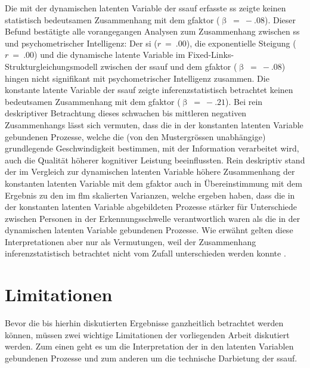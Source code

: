 \documentclass[11pt, twoside, a4paper]{book}		%
\begin{document}
Die mit der dynamischen latenten Variable der \gls{ssauf} erfasste \gls{ss} zeigte keinen statistisch bedeutsamen Zusammenhang mit dem \gls{gfaktor} ($\upbeta~=~-.08$). Dieser Befund bestätigte alle vorangegangen Analysen zum Zusammenhang zwischen \gls{ss} und psychometrischer Intelligenz: Der \gls{si} ($r~=~.00$), die exponentielle Steigung ($r~=~.00$) und die dynamische latente Variable im Fixed-Links-Struk\-tur\-glei\-chungs\-mo\-dell zwischen der \gls{ssauf} und dem \gls{gfaktor} ($\upbeta~=~-.08$) hingen nicht signifikant mit psychometrischer Intelligenz zusammen.
Die konstante latente Variable der \gls{ssauf} zeigte inferenzstatistisch betrachtet keinen bedeutsamen Zusammenhang mit dem \gls{gfaktor} ($\upbeta~=~-.21$). Bei rein deskriptiver Betrachtung dieses schwachen bis mittleren negativen Zusammenhangs lässt sich vermuten, dass die in der konstanten latenten Variable gebundenen Prozesse, welche die  (von den Mustergrössen unabhängige) grundlegende Geschwindigkeit bestimmen, mit der Information verarbeitet wird, auch die Qualität höherer kognitiver Leistung beeinflussten.
Rein deskriptiv stand der im Vergleich zur dynamischen latenten Variable höhere Zusammenhang der konstanten latenten Variable mit dem \gls{gfaktor} auch in Übereinstimmung mit dem Ergebnis zu den im \gls{flm} skalierten Varianzen, welche ergeben haben, dass die in der konstanten latenten Variable abgebildeten Prozesse stärker für Unterschiede zwischen Personen in der Erkennungsschwelle verantwortlich waren als die in der dynamischen latenten Variable gebundenen Prozesse. Wie erwähnt gelten diese Interpretationen aber nur als Vermutungen, weil der Zusammenhang inferenzstatistisch betrachtet nicht vom Zufall unterschieden werden konnte \citep[für eine statistische Rechtfertigung dieser Vorgehensweise siehe][]{Gelman2006, Wasserstein2016}.










\section{Limitationen}

Bevor die bis hierhin diskutierten Ergebnisse ganzheitlich betrachtet werden können, müssen zwei wichtige Limitationen der vorliegenden Arbeit diskutiert werden. Zum einen geht es um die Interpretation der in den latenten Variablen gebundenen Prozesse und zum anderen um die technische Darbietung der \gls{ssauf}.
\end{document}
